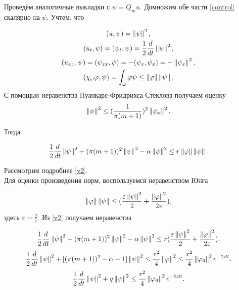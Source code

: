 Проведём аналогичные выкладки с $\psi = Q_m u$. Домножим обе части 
\eqref{control} скалярно на $\psi$. Учтем, что

\begin{gather*}
    (u, \psi) = \left\lVert\psi\right\rVert^2,\\*
    (u_t, \psi) = (\psi_t, \psi) = \frac{1}{2} \frac{d}{dt} \left\lVert\psi\right\rVert^2,\\*
    (u_{xx}, \psi) = (\psi_{xx}, \psi) = -(\psi_x, \psi_x) = -
    \left\lVert\psi_x\right\rVert^2,\\*
    (\chi_{\omega}\varphi, \psi) = \int_{\omega}{\varphi \psi} \le
    \left\lVert\varphi\right\rVert \left\lVert\psi\right\rVert.
\end{gather*}
С помощью неравенства Пуанкаре-Фридрихса-Стеклова получаем оценку
\begin{equation}
    \left\lVert\psi\right\rVert^2 \le (\frac{1}{\pi(m + 1)})^2 \left\lVert\psi_x\right\rVert^2.
\end{equation}

Тогда

\begin{equation}\label{v2}
    \frac{1}{2} \frac{d}{dt} \left\lVert\psi\right\rVert^2 + (\pi(m + 1))^2 \left\lVert\psi\right\rVert^2 - 
    \alpha \left\lVert\psi\right\rVert^2 \le r \left\lVert\varphi\right\rVert \left\lVert\psi\right\rVert.
\end{equation}

Рассмотрим подробнее \eqref{v2}.\\
Для оценки произведения норм, воспользуемся неравенством Юнга

\begin{equation*}
    \left\lVert\varphi\right\rVert \left\lVert\psi\right\rVert \le (\frac{\varepsilon \left\lVert\psi\right\rVert^2}{2} + 
    \frac{\left\lVert\varphi\right\rVert^2}{2 \varepsilon}),
\end{equation*}
здесь $\varepsilon = \frac{2}{r}$. Из \eqref{v2} получаем неравенства

\begin{equation*}
    \frac{1}{2} \frac{d}{dt} \left\lVert\psi\right\rVert^2 + (\pi(m + 1))^2 \left\lVert\psi\right\rVert^2 - 
    \alpha \left\lVert\psi\right\rVert^2 \le r (\frac{\varepsilon \left\lVert\psi\right\rVert^2}{2} + 
    \frac{\left\lVert\varphi\right\rVert^2}{2 \varepsilon}).
\end{equation*}
\begin{equation*}
    \frac{1}{2} \frac{d}{dt} \left\lVert\psi\right\rVert^2  + [(\pi(m + 1))^2 - \alpha - 1] 
    \left\lVert\psi\right\rVert^2 \le \frac{r^2}{4}\left\lVert\varphi\right\rVert^2 \le 
    \frac{r^2}{4}\left\lVert\varphi_0\right\rVert^2 e^{-2\beta t}.
\end{equation*}
\begin{equation}
    \frac{1}{2} \frac{d}{dt} \left\lVert\psi\right\rVert^2 + q\left\lVert\psi\right\rVert^2 \le 
    \frac{r^2}{4}\left\lVert\varphi_0\right\rVert^2 e^{-2\beta t}.
\end{equation}

